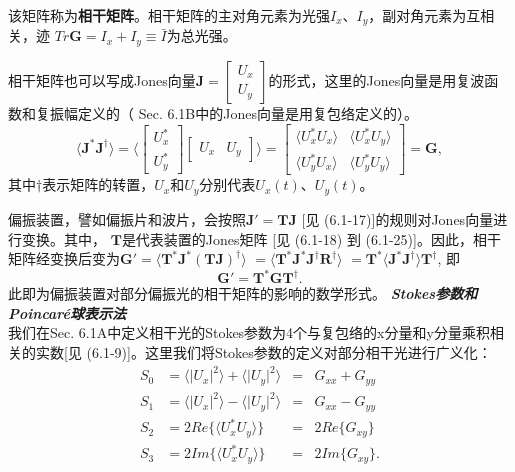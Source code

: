 \documentclass[UTF8]{ctexart}
\numberwithin{figure}{subsection}
\numberwithin{table}{subsection}
\begin{document}
该矩阵称为\textbf{相干矩阵}。相干矩阵的主对角元素为光强$I_x$、$I_y$，副对角元素为互相关，迹 $Tr\mathbf{G} = I_x + I_y  \equiv \bar{I}$为总光强。
\par 相干矩阵也可以写成Jones向量$\mathbf{J} = \begin{bmatrix}U_x \\ U_y \end{bmatrix}$的形式，这里的Jones向量是用复波函数和复振幅定义的（ Sec. 6.1B中的Jones向量是用复包络定义的）。
\begin{equation}
\langle \mathbf{J}^\ast \mathbf{J}^{\dag} \rangle = \langle 
\begin{bmatrix}
U_x^\ast \\
U_y^\ast
\end{bmatrix}
\begin{bmatrix}
U_x & U_y
\end{bmatrix}
\rangle =
\begin{bmatrix}
\langle U_x^\ast U_x \rangle & \langle U_x^\ast U_y \rangle \\
\langle U_y^\ast U_x \rangle & \langle U_y^\ast U_y \rangle 
\end{bmatrix}
= \mathbf{G} ,
\end{equation}
其中$\dag$表示矩阵的转置，$U_x$和$U_y$分别代表$U_x (t)$、$U_y (t)$。
\par 偏振装置，譬如偏振片和波片，会按照$\mathbf{J' = TJ}$ [见 (6.1-17)]的规则对Jones向量进行变换。其中， $\mathbf{T}$是代表装置的Jones矩阵 [见 (6.1-18) 到 (6.1-25)]。因此，相干矩阵经变换后变为$\mathbf{ G' = \langle T^\ast J^\ast (TJ)^\dag \rangle }$ $\mathbf{= \langle T^\ast J^\ast J^\dag R^\dag \rangle} $ $\mathbf{= T^\ast \langle J^\ast J^\dag \rangle T^\dag}$, 即
\begin{equation}
\mathbf{G' = T^\ast G T^\dag} .
\end{equation}
此即为偏振装置对部分偏振光的相干矩阵的影响的数学形式。
\bigbreak\noindent\textcolor{ksc}{\textbf{\textsl{Stokes参数和Poincar\'{e}球表示法}}}\\
我们在Sec. 6.1A中定义相干光的Stokes参数为4个与复包络的x分量和y分量乘积相关的实数[见 (6.1-9)]。这里我们将Stokes参数的定义对部分相干光进行广义化：
\begin{subequations}
\begin{alignat}{3}
S_0 &= \langle \lvert U_x \rvert^2 \rangle + \langle \lvert U_y \rvert^2 \rangle &=& G_{xx} + G_{yy} \\
S_1 &= \langle \lvert U_x \rvert^2 \rangle - \langle \lvert U_y \rvert^2 \rangle &= &G_{xx} - G_{yy} \\
S_2 &= 2Re\{\langle U_x^\ast U_y \rangle \} &=& 2Re\{G_{xy} \} \\
S_3 &= 2Im\{\langle U_x^\ast U_y \rangle \} &= &2Im\{G_{xy} \} .
\end{alignat}
\end{subequations} 
\end{document}

